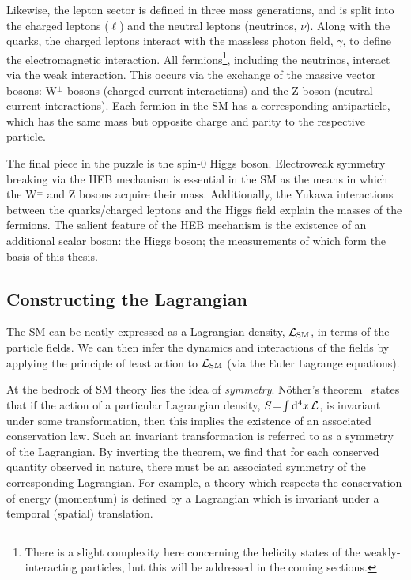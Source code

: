 Likewise, the lepton sector is defined in three mass generations, and is split into the charged leptons ($\ell$) and the neutral leptons (neutrinos, $\nu$). Along with the quarks, the charged leptons interact with the massless photon field, $\gamma$, to define the electromagnetic interaction. All fermions\footnote{There is a slight complexity here concerning the helicity states of the weakly-interacting particles, but this will be addressed in the coming sections.}, including the neutrinos, interact via the weak interaction. This occurs via the exchange of the massive vector bosons: W$^{\pm}$ bosons (charged current interactions) and the Z boson (neutral current interactions). Each fermion in the SM has a corresponding antiparticle, which has the same mass but opposite charge and parity to the respective particle.

The final piece in the puzzle is the spin-0 Higgs boson. Electroweak symmetry breaking via the HEB mechanism is essential in the SM as the means in which the W$^{\pm}$ and Z bosons acquire their mass. Additionally, the Yukawa interactions between the quarks/charged leptons and the Higgs field explain the masses of the fermions. The salient feature of the HEB mechanism is the existence of an additional scalar boson: the Higgs boson; the measurements of which form the basis of this thesis.

\subsection{Constructing the Lagrangian}
The SM can be neatly expressed as a Lagrangian density, $\mathcal{L}_{\rm{SM}}$, in terms of the particle fields. We can then infer the dynamics and interactions of the fields by applying the principle of least action to $\mathcal{L}_{\rm{SM}}$ (via the Euler Lagrange equations). 

At the bedrock of SM theory lies the idea of \textit{symmetry}. N\"{o}ther's theorem~\cite{doi:10.1080_00411457108231446} states that if the action of a particular Lagrangian density, $S \!=\! \int {\rm{d}}^4x\, \mathcal{L}$, is invariant under some transformation, then this implies the existence of an associated conservation law. Such an invariant transformation is referred to as a symmetry of the Lagrangian. By inverting the theorem, we find that for each conserved quantity observed in nature, there must be an associated symmetry of the corresponding Lagrangian. For example, a theory which respects the conservation of energy (momentum) is defined by a Lagrangian which is invariant under a temporal (spatial) translation.

